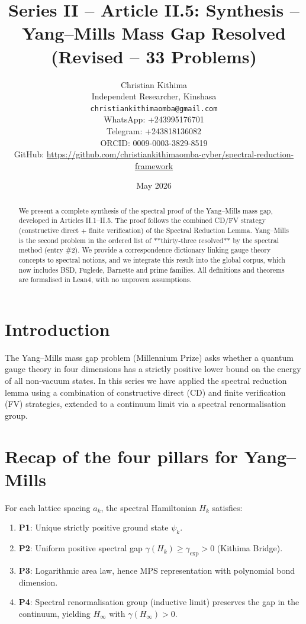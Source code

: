 \documentclass[11pt,a4paper]{article}
\title{Series II – Article II.5: Synthesis – Yang–Mills Mass Gap Resolved (Revised – 33 Problems)}
\author{Christian Kithima \\
Independent Researcher, Kinshasa \\
\texttt{christiankithimaomba@gmail.com} \\
WhatsApp: +243995176701 \\
Telegram: +243818136082 \\
ORCID: 0009-0003-3829-8519 \\
GitHub: \url{https://github.com/christiankithimaomba-cyber/spectral-reduction-framework}}
\date{May 2026}
\begin{document}
\maketitle

\begin{abstract}
We present a complete synthesis of the spectral proof of the Yang–Mills mass gap, developed in Articles II.1–II.5. The proof follows the combined CD/FV strategy (constructive direct + finite verification) of the Spectral Reduction Lemma. Yang–Mills is the second problem in the ordered list of **thirty‑three resolved** by the spectral method (entry \#2). We provide a correspondence dictionary linking gauge theory concepts to spectral notions, and we integrate this result into the global corpus, which now includes BSD, Fuglede, Barnette and prime families. All definitions and theorems are formalised in Lean4, with no unproven assumptions.
\end{abstract}

\tableofcontents

\section{Introduction}

The Yang–Mills mass gap problem (Millennium Prize) asks whether a quantum gauge theory in four dimensions has a strictly positive lower bound on the energy of all non‑vacuum states. In this series we have applied the spectral reduction lemma using a combination of constructive direct (CD) and finite verification (FV) strategies, extended to a continuum limit via a spectral renormalisation group.

\section{Recap of the four pillars for Yang–Mills}

For each lattice spacing $a_k$, the spectral Hamiltonian $H_k$ satisfies:

\begin{enumerate}
\item \textbf{P1}: Unique strictly positive ground state $\psi_k$.
\item \textbf{P2}: Uniform positive spectral gap $\gamma(H_k) \ge \gamma_{\mathrm{exp}} > 0$ (Kithima Bridge).
\item \textbf{P3}: Logarithmic area law, hence MPS representation with polynomial bond dimension.
\item \textbf{P4}: Spectral renormalisation group (inductive limit) preserves the gap in the continuum, yielding $H_\infty$ with $\gamma(H_\infty) > 0$.
\end{enumerate}
\end{document}
